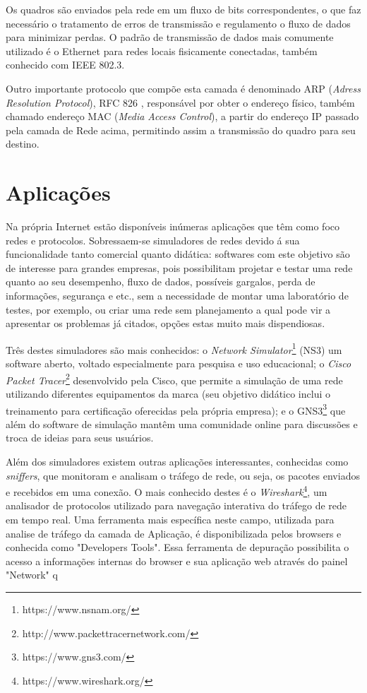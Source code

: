 Os quadros são enviados pela rede em um fluxo de bits correspondentes, o que faz necessário o tratamento de erros de transmissão e regulamento o fluxo de dados para minimizar perdas. O padrão de transmissão de dados mais comumente utilizado é o Ethernet para redes locais fisicamente conectadas, também conhecido com IEEE 802.3.

Outro importante protocolo que compõe esta camada é denominado ARP (\textit{Adress Resolution Protocol}), RFC 826 \cite{RFC826}, responsável por obter o endereço físico, tamb\'em chamado endereço MAC (\textit{Media Access Control}), a partir do endereço IP passado pela camada de Rede acima, permitindo assim a transmiss\~ao do quadro para seu destino.

\section{Aplicações}

Na própria Internet estão disponíveis inúmeras aplicações que têm como foco redes e protocolos. Sobressaem-se simuladores de redes devido á sua funcionalidade tanto comercial quanto didática: softwares com este objetivo são de interesse para grandes empresas, pois possibilitam projetar e testar uma rede quanto ao seu desempenho, fluxo de dados, possíveis gargalos, perda de informações, segurança e etc., sem a necessidade de montar uma laboratório de testes, por exemplo, ou criar uma rede sem planejamento a qual pode vir a apresentar os problemas já citados, opções estas muito mais dispendiosas.

Três destes simuladores são mais conhecidos: o \textit{Network Simulator}\footnote{https://www.nsnam.org/} (NS3) um software aberto, voltado especialmente para pesquisa e uso educacional; o \textit{Cisco Packet Tracer}\footnote{http://www.packettracernetwork.com/} desenvolvido pela Cisco\textregistered, que permite a simulação de uma rede utilizando diferentes equipamentos da marca (seu objetivo didático inclui o treinamento para certificação oferecidas pela própria empresa); e o GNS3\footnote{https://www.gns3.com/} que além do software de simulação mantêm uma comunidade online para discussões e troca de ideias para seus usuários. 

Além dos simuladores existem outras aplicações interessantes, conhecidas como \textit{sniffers}, que monitoram e analisam o tráfego de rede, ou seja, os pacotes enviados e recebidos em uma conexão. O mais conhecido destes é o \textit{Wireshark}\footnote{https://www.wireshark.org/}, um analisador de protocolos utilizado para navegação interativa do tráfego de rede em tempo real. Uma ferramenta mais específica neste campo, utilizada para analise de tráfego  da camada de Aplicação, é disponibilizada pelos browsers e conhecida como "Developers Tools". Essa ferramenta de depuração possibilita o acesso a informações internas do browser e sua aplicaç\~ao web atrav\'es do painel "Network" q

